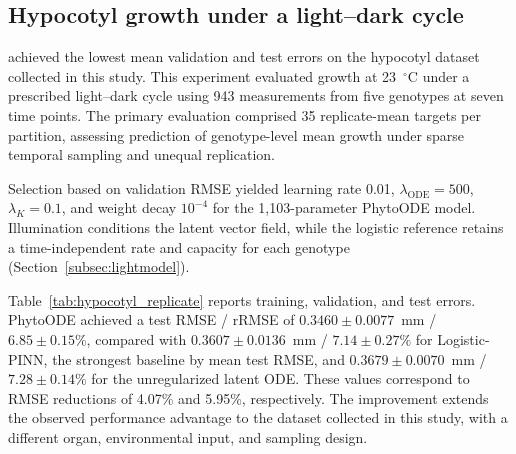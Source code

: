 \subsection{Hypocotyl growth under a light--dark cycle}
\label{subsec:hypocotylresults}

\model{} achieved the lowest mean validation and test errors on the hypocotyl dataset collected in this study. This experiment evaluated growth at 23~$^{\circ}$C under a prescribed light--dark cycle using 943 measurements from five genotypes at seven time points. The primary evaluation comprised 35 replicate-mean targets per partition, assessing prediction of genotype-level mean growth under sparse temporal sampling and unequal replication.

Selection based on validation RMSE yielded learning rate 0.01, $\lambda_{\mathrm{ODE}}=500$, $\lambda_K=0.1$, and weight decay $10^{-4}$ for the 1,103-parameter PhytoODE model. Illumination conditions the latent vector field, while the logistic reference retains a time-independent rate and capacity for each genotype (Section~\ref{subsec:lightmodel}).

Table~\ref{tab:hypocotyl_replicate} reports training, validation, and test errors. PhytoODE achieved a test RMSE / rRMSE of $0.3460\pm0.0077$~mm / $6.85\pm0.15\%$, compared with $0.3607\pm0.0136$~mm / $7.14\pm0.27\%$ for Logistic-PINN, the strongest baseline by mean test RMSE, and $0.3679\pm0.0070$~mm / $7.28\pm0.14\%$ for the unregularized latent ODE. These values correspond to RMSE reductions of 4.07\% and 5.95\%, respectively. The improvement extends the observed performance advantage to the dataset collected in this study, with a different organ, environmental input, and sampling design.

